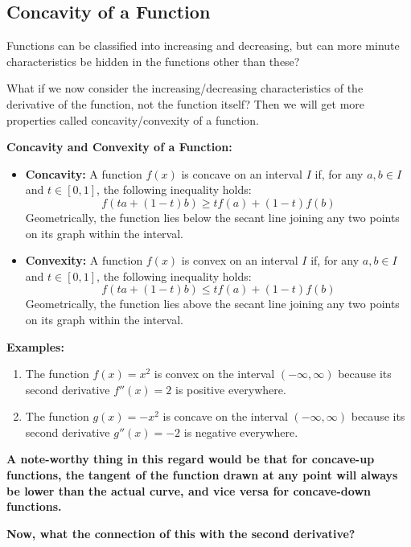 \subsection{Concavity of a Function}

Functions can be classified into increasing and decreasing, but can more minute characteristics be hidden in the functions other than these? 

What if we now consider the increasing/decreasing characteristics of the derivative of the function, not the function itself? Then we will get more properties called concavity/convexity of a function. 

\textbf{Concavity and Convexity of a Function:}

\begin{itemize}
    \item \textbf{Concavity:} A function $f(x)$ is concave on an interval $I$ if, for any $a, b \in I$ and $t \in [0, 1]$, the following inequality holds:
    \[
    f(ta + (1-t)b) \geq tf(a) + (1-t)f(b)
    \]
    Geometrically, the function lies below the secant line joining any two points on its graph within the interval.

    \item \textbf{Convexity:} A function $f(x)$ is convex on an interval $I$ if, for any $a, b \in I$ and $t \in [0, 1]$, the following inequality holds:
    \[
    f(ta + (1-t)b) \leq tf(a) + (1-t)f(b)
    \]
    Geometrically, the function lies above the secant line joining any two points on its graph within the interval.
\end{itemize}

\textbf{Examples:}
\begin{enumerate}
    \item The function $f(x) = x^2$ is convex on the interval $(-\infty, \infty)$ because its second derivative $f''(x) = 2$ is positive everywhere.
    
    \item The function $g(x) = -x^2$ is concave on the interval $(-\infty, \infty)$ because its second derivative $g''(x) = -2$ is negative everywhere.
\end{enumerate}


\textbf{A note-worthy thing in this regard would be that for concave-up functions, the tangent of the function drawn at any point will always be lower than the actual curve, and vice versa for concave-down functions.}

\textbf{Now, what the connection of this with the second derivative?}

